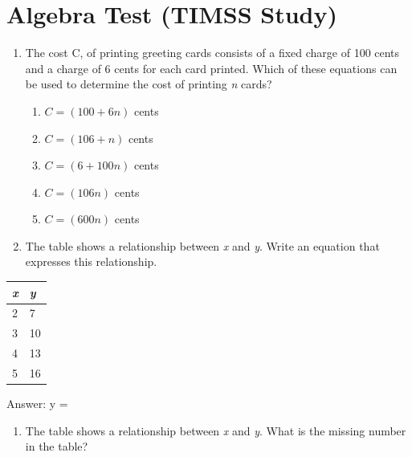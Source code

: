 \documentclass[11pt]{umnthesis}
\begin{document}
\hypertarget{algebra-test-timss-study}{%
\section*{Algebra Test (TIMSS Study)}\label{algebra-test-timss-study}}

\begin{enumerate}
\def\labelenumi{\arabic{enumi}.}
\tightlist
\item
  The cost C, of printing greeting cards consists of a fixed charge of 100 cents and a charge of 6 cents for each card printed. Which of these equations can be used to determine the cost of printing \emph{n} cards?

  \begin{enumerate}
  \def\labelenumii{\alph{enumii}.}
  \tightlist
  \item
    \(C = (100 + 6n)\) cents
  \item
    \(C = (106 + n)\) cents
  \item
    \(C = (6 + 100n)\) cents
  \item
    \(C = (106n)\) cents
  \item
    \(C = (600n)\) cents
  \end{enumerate}
\item
  The table shows a relationship between \emph{x} and \emph{y}. Write an equation that expresses this relationship.
\end{enumerate}

\begin{longtable}[]{@{}ll@{}}
\toprule
\emph{x} & \emph{y} \\
\midrule
\endhead
2 & 7 \\
3 & 10 \\
4 & 13 \\
5 & 16 \\
\bottomrule
\end{longtable}

\hspace{2in}

Answer: y = \underline{\hspace{3cm}}

\pagebreak

\begin{enumerate}
\def\labelenumi{\arabic{enumi}.}
\setcounter{enumi}{2}
\tightlist
\item
  The table shows a relationship between \emph{x} and \emph{y}. What is the missing number in the table?
\end{enumerate}
\end{document}
